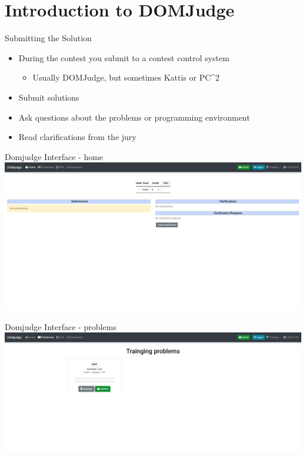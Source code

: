 \documentclass[11pt,pdf, aspectratio=169]{beamer}
\begin{document}
  \section{Introduction to DOMJudge}
  \begin{frame}{Submitting the Solution}
    \begin{itemize}
      \item During the contest you submit to a contest control system
      \begin{itemize}
        \item Usually DOMJudge, but sometimes Kattis or PC\textasciicircum2
      \end{itemize}
      \item Submit solutions
      \item Ask questions about the problems or programming environment
      \item Read clarifications from the jury
    \end{itemize}
  \end{frame}
  \begin{frame}{Domjudge Interface - home}
    \includegraphics[width=\linewidth]{images/session-1/domjudge-initial}
  \end{frame}
  \begin{frame}{Domjudge Interface - problems}
    \includegraphics[width=\linewidth]{images/session-1/domjudge-problems}
  \end{frame}
\end{document}

